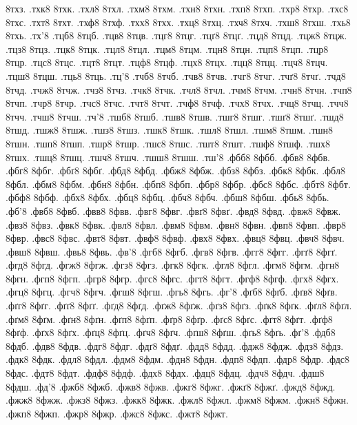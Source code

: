 {8тхз.
.тхк8
8тхк.
.тхл8
8тхл.
.тхм8
8тхм.
.тхн8
8тхн.
.тхп8
8тхп.
.тхр8
8тхр.
.тхс8
8тхс.
.тхт8
8тхт.
.тхф8
8тхф.
.тхх8
8тхх.
.тхц8
8тхц.
.тхч8
8тхч.
.тхш8
8тхш.
.тхь8
8тхь.
.тх'8
.тцб8
8тцб.
.тцв8
8тцв.
.тцг8
8тцг.
.тцґ8
8тцґ.
.тцд8
8тцд.
.тцж8
8тцж.
.тцз8
8тцз.
.тцк8
8тцк.
.тцл8
8тцл.
.тцм8
8тцм.
.тцн8
8тцн.
.тцп8
8тцп.
.тцр8
8тцр.
.тцс8
8тцс.
.тцт8
8тцт.
.тцф8
8тцф.
.тцх8
8тцх.
.тцц8
8тцц.
.тцч8
8тцч.
.тцш8
8тцш.
.тць8
8тць.
.тц'8
.тчб8
8тчб.
.тчв8
8тчв.
.тчг8
8тчг.
.тчґ8
8тчґ.
.тчд8
8тчд.
.тчж8
8тчж.
.тчз8
8тчз.
.тчк8
8тчк.
.тчл8
8тчл.
.тчм8
8тчм.
.тчн8
8тчн.
.тчп8
8тчп.
.тчр8
8тчр.
.тчс8
8тчс.
.тчт8
8тчт.
.тчф8
8тчф.
.тчх8
8тчх.
.тчц8
8тчц.
.тчч8
8тчч.
.тчш8
8тчш.
.тч'8
.тшб8
8тшб.
.тшв8
8тшв.
.тшг8
8тшг.
.тшґ8
8тшґ.
.тшд8
8тшд.
.тшж8
8тшж.
.тшз8
8тшз.
.тшк8
8тшк.
.тшл8
8тшл.
.тшм8
8тшм.
.тшн8
8тшн.
.тшп8
8тшп.
.тшр8
8тшр.
.тшс8
8тшс.
.тшт8
8тшт.
.тшф8
8тшф.
.тшх8
8тшх.
.тшц8
8тшц.
.тшч8
8тшч.
.тшш8
8тшш.
.тш'8
.фбб8
8фбб.
.фбв8
8фбв.
.фбг8
8фбг.
.фбґ8
8фбґ.
.фбд8
8фбд.
.фбж8
8фбж.
.фбз8
8фбз.
.фбк8
8фбк.
.фбл8
8фбл.
.фбм8
8фбм.
.фбн8
8фбн.
.фбп8
8фбп.
.фбр8
8фбр.
.фбс8
8фбс.
.фбт8
8фбт.
.фбф8
8фбф.
.фбх8
8фбх.
.фбц8
8фбц.
.фбч8
8фбч.
.фбш8
8фбш.
.фбь8
8фбь.
.фб'8
.фвб8
8фвб.
.фвв8
8фвв.
.фвг8
8фвг.
.фвґ8
8фвґ.
.фвд8
8фвд.
.фвж8
8фвж.
.фвз8
8фвз.
.фвк8
8фвк.
.фвл8
8фвл.
.фвм8
8фвм.
.фвн8
8фвн.
.фвп8
8фвп.
.фвр8
8фвр.
.фвс8
8фвс.
.фвт8
8фвт.
.фвф8
8фвф.
.фвх8
8фвх.
.фвц8
8фвц.
.фвч8
8фвч.
.фвш8
8фвш.
.фвь8
8фвь.
.фв'8
.фгб8
8фгб.
.фгв8
8фгв.
.фгг8
8фгг.
.фгґ8
8фгґ.
.фгд8
8фгд.
.фгж8
8фгж.
.фгз8
8фгз.
.фгк8
8фгк.
.фгл8
8фгл.
.фгм8
8фгм.
.фгн8
8фгн.
.фгп8
8фгп.
.фгр8
8фгр.
.фгс8
8фгс.
.фгт8
8фгт.
.фгф8
8фгф.
.фгх8
8фгх.
.фгц8
8фгц.
.фгч8
8фгч.
.фгш8
8фгш.
.фгь8
8фгь.
.фг'8
.фґб8
8фґб.
.фґв8
8фґв.
.фґг8
8фґг.
.фґґ8
8фґґ.
.фґд8
8фґд.
.фґж8
8фґж.
.фґз8
8фґз.
.фґк8
8фґк.
.фґл8
8фґл.
.фґм8
8фґм.
.фґн8
8фґн.
.фґп8
8фґп.
.фґр8
8фґр.
.фґс8
8фґс.
.фґт8
8фґт.
.фґф8
8фґф.
.фґх8
8фґх.
.фґц8
8фґц.
.фґч8
8фґч.
.фґш8
8фґш.
.фґь8
8фґь.
.фґ'8
.фдб8
8фдб.
.фдв8
8фдв.
.фдг8
8фдг.
.фдґ8
8фдґ.
.фдд8
8фдд.
.фдж8
8фдж.
.фдз8
8фдз.
.фдк8
8фдк.
.фдл8
8фдл.
.фдм8
8фдм.
.фдн8
8фдн.
.фдп8
8фдп.
.фдр8
8фдр.
.фдс8
8фдс.
.фдт8
8фдт.
.фдф8
8фдф.
.фдх8
8фдх.
.фдц8
8фдц.
.фдч8
8фдч.
.фдш8
8фдш.
.фд'8
.фжб8
8фжб.
.фжв8
8фжв.
.фжг8
8фжг.
.фжґ8
8фжґ.
.фжд8
8фжд.
.фжж8
8фжж.
.фжз8
8фжз.
.фжк8
8фжк.
.фжл8
8фжл.
.фжм8
8фжм.
.фжн8
8фжн.
.фжп8
8фжп.
.фжр8
8фжр.
.фжс8
8фжс.
.фжт8
8фжт.
}
